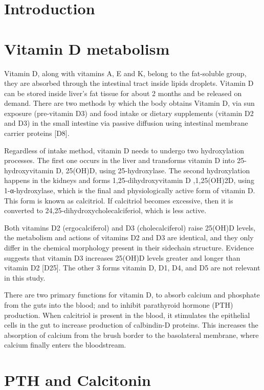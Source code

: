 


\section{Introduction}


\section{Vitamin D metabolism }

Vitamin D, along with vitamins A, E and K, belong to the fat-soluble group, they are absorbed through the intestinal tract inside lipids droplets. Vitamin D can be stored inside liver’s fat tissue for about 2 months and be released on demand. There are two methods by which the body obtains Vitamin D, via sun exposure (pre-vitamin D3) and food intake or dietary supplements (vitamin D2 and D3) in the small intestine via passive diffusion using intestinal membrane carrier proteins [D8]. 

Regardless of intake method, vitamin D needs to undergo two hydroxylation processes. The first one occurs in the liver and transforms vitamin D into 25-hydroxyvitamin D, 25(OH)D, using 25-hydroxylase. The second hydroxylation happens in the kidneys and forms 1,25-dihydroxyvitamin D ,1,25(OH)2D, using 1-α-hydroxylase, which is the final and physiologically active form of vitamin D. This form is known as calcitriol. If calcitriol becomes excessive, then it is converted to 24,25-dihydroxycholecalciferiol, which is less active.  

Both vitamins D2 (ergocalciferol) and D3 (cholecalciferol) raise 25(OH)D levels, the metabolism and actions of vitamins D2 and D3 are identical, and they only differ in the chemical morphology present in their sidechain structure. Evidence suggests that vitamin D3 increases 25(OH)D levels greater and longer than vitamin D2 [D25]. The other 3 forms vitamin D, D1, D4, and D5 are not relevant in this study. 

There are two primary functions for vitamin D, to absorb calcium and phosphate from the guts into the blood; and to inhibit parathyroid hormone (PTH) production. When calcitriol is present in the blood, it stimulates the epithelial cells in the gut to increase production of calbindin-D proteins. This increases the absorption of calcium from the brush border to the basolateral membrane, where calcium finally enters the bloodstream. 


\section{PTH and Calcitonin}

